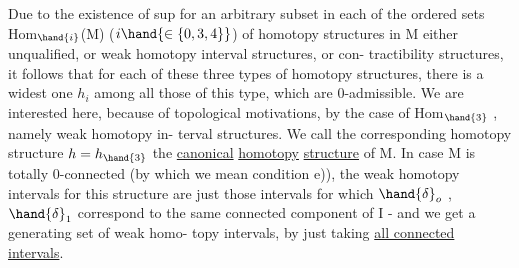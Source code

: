 Due to the existence of  sup for an arbitrary subset\hand{,} in
each of the ordered sets Hom$_{\hand{i}}$(M) ($i\hand{\in\{0,3,4\}}$) of homotopy structures in
M \hand{(} either unqualified, or weak homotopy interval structures, or con-%
tractibility structures\hand{)}, it follows that for each of these three types
of homotopy structures, there is a widest one $h_i$ among all those of
this type, which are 0-admissible. We are interested here, because of
topological motivations, by the case of Hom$_{\hand{3}}$ , namely weak homotopy in-%
terval structures. We call the corresponding homotopy structure $h=h_{\hand{3}}$
the \uline{canonical} \uline{homotopy} \uline{structure} of M. In case M is totally 0-connected
(by which we mean condition e)), the weak homotopy intervals for this
structure are just those intervals for which $\hand{\delta}_o$ , $\hand{\delta}_1$ correspond to the
same connected component of I - and we get a generating set of weak homo-%
topy intervals, by just taking \uline{all connected intervals}. 


